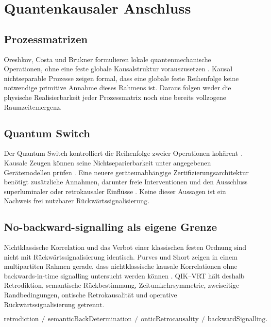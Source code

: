 \documentclass[11pt,a4paper]{article}
\newcommand{\QIKVRT}{QIK--VRT}
\begin{document}
\section{Quantenkausaler Anschluss}

\subsection{Prozessmatrizen}

Oreshkov, Costa und Brukner formulieren lokale quantenmechanische Operationen,
ohne eine feste globale Kausalstruktur vorauszusetzen
\cite{Oreshkov2012}. Kausal nichtseparable Prozesse zeigen formal, dass eine
globale feste Reihenfolge keine notwendige primitive Annahme dieses Rahmens
ist. Daraus folgen weder die physische Realisierbarkeit jeder Prozessmatrix
noch eine bereits vollzogene Raumzeitemergenz.

\subsection{Quantum Switch}

Der Quantum Switch kontrolliert die Reihenfolge zweier Operationen kohärent
\cite{Chiribella2013}. Kausale Zeugen können seine Nichtseparierbarkeit unter
angegebenen Gerätemodellen prüfen \cite{Araujo2015,Goswami2018}. Eine neuere
geräteunabhängige Zertifizierungsarchitektur benötigt zusätzliche Annahmen,
darunter freie Interventionen und den Ausschluss superluminaler oder
retrokausaler Einflüsse \cite{VanDerLugt2023}. Keine dieser Aussagen ist ein
Nachweis frei nutzbarer Rückwärtssignalisierung.

\subsection{No-backward-signalling als eigene Grenze}

Nichtklassische Korrelation und das Verbot einer klassischen festen Ordnung
sind nicht mit Rückwärtssignalisierung identisch. Purves und Short zeigen in
einem multipartiten Rahmen gerade, dass nichtklassische kausale Korrelationen
ohne backwards-in-time signalling untersucht werden können
\cite{PurvesShort2019}. \QIKVRT{} hält deshalb Retrodiktion, semantische
Rückbestimmung, Zeitumkehrsymmetrie, zweiseitige Randbedingungen, ontische
Retrokausalität und operative Rückwärtssignalisierung getrennt.

\begin{equation}
 \mathrm{retrodiction}
 \neq \mathrm{semanticBackDetermination}
 \neq \mathrm{onticRetrocausality}
 \neq \mathrm{backwardSignalling}.
\end{equation}
\end{document}
